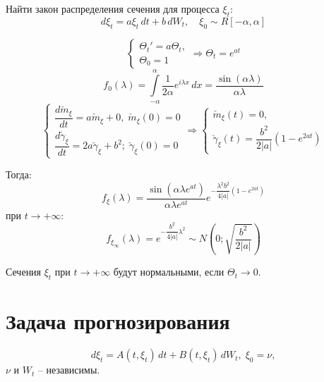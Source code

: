 \begin{ex} Найти закон распределения сечения для процесса $\xi_t$:
  \[
    d\xi_t = a \xi_t \, dt + b \, dW_t, \quad \xi_0 \sim R[-\alpha, \alpha]
  \]
  
  \[
    \begin{cases}
      \Theta_t' = a \Theta_t, \\
      \Theta_0 = 1
    \end{cases}
    \Rightarrow
    \Theta_t = e^{at}
  \]
  \[
    f_0 (\lambda) = \int\limits_{-\alpha}^{\alpha} \dfrac{1}{2\alpha} e^{i\lambda x} \, dx = \dfrac{\sin(\alpha \lambda)}{\alpha\lambda}
  \]
  \[
    \begin{cases}
      \dfrac{d \check{m}_\xi}{dt} = a \check{m}_\xi + 0, \; \check{m}_\xi(0) = 0 \\
      \dfrac{d \check{\gamma}_\xi}{dt} = 2a \check{\gamma}_\xi + b^2; \; \check{\gamma}_\xi(0) = 0
    \end{cases}
    \Rightarrow
    \begin{cases}
      \check{m}_\xi(t) = 0, \\
      \check{\gamma}_\xi(t) = \dfrac{b^2}{2|a|} \left( 1 - e^{2at} \right) 
    \end{cases}
  \]

  Тогда:
  \[
    f_\xi(\lambda) = \dfrac{\sin\left(\alpha\lambda e^{at}\right)}{\alpha\lambda e^{at}} e^{- \dfrac{\lambda^2 b^2}{4|a|} (1 - e^{2at})}
  \]
  при $t \to + \infty$:
  \[
    f_{\xi_\infty}(\lambda) = e^{- \dfrac{b^2}{4|a|} \lambda^2} \sim N\left(0; \sqrt{\dfrac{b^2}{2|a|}}\right)
  \]

  \begin{remark*}
    Сечения $\xi_t$ при $t \to +\infty$ будут нормальными, если $\Theta_t \to 0$.
  \end{remark*}
\end{ex}


\section{Задача прогнозирования}

\[
  d\xi_t = A(t, \xi_t) \, dt + B(t, \xi_t) \, dW_t, \; \xi_0=\nu,
\]
$\nu$ и $W_t$ -- независимы.


